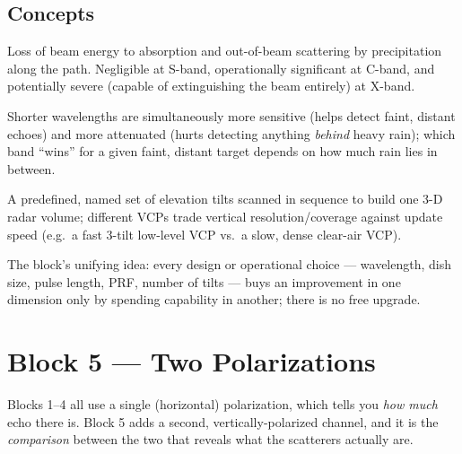 \documentclass[11pt]{article}
\begin{document}
\subsection{Concepts}
\begin{description}[leftmargin=1.6cm,style=nextline]
\item[Attenuation] Loss of beam energy to absorption and out-of-beam scattering by precipitation along the path. Negligible at S-band, operationally significant at C-band, and potentially severe (capable of extinguishing the beam entirely) at X-band.
\item[Sensitivity--attenuation competition] Shorter wavelengths are simultaneously more sensitive (helps detect faint, distant echoes) and more attenuated (hurts detecting anything \emph{behind} heavy rain); which band ``wins'' for a given faint, distant target depends on how much rain lies in between.
\item[Volume Coverage Pattern (VCP)] A predefined, named set of elevation tilts scanned in sequence to build one 3-D radar volume; different VCPs trade vertical resolution/coverage against update speed (e.g.\ a fast 3-tilt low-level VCP vs.\ a slow, dense clear-air VCP).
\item[Coupled cost] The block's unifying idea: every design or operational choice --- wavelength, dish size, pulse length, PRF, number of tilts --- buys an improvement in one dimension only by spending capability in another; there is no free upgrade.
\end{description}

\section{Block 5 --- Two Polarizations}

Blocks 1--4 all use a single (horizontal) polarization, which tells you \emph{how much} echo there is. Block 5 adds a second, vertically-polarized channel, and it is the \emph{comparison} between the two that reveals what the scatterers actually are.
\end{document}
